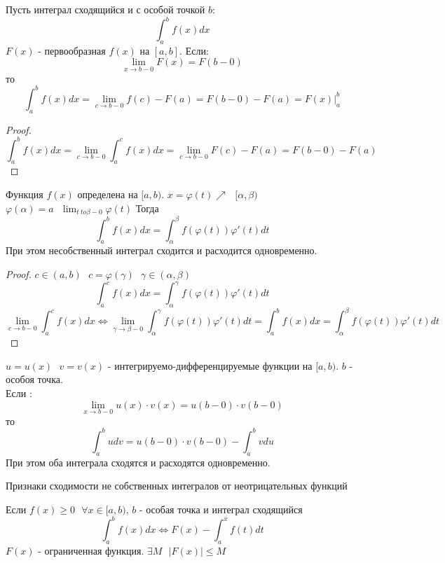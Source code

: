 \begin{theorem}[3]
  Пусть интеграл сходящийся и с особой точкой $b$:
  \[
    \int^{b}_{a} f(x)dx
  \]
  $F(x)$ - первообразная $f(x)$ на $[a, b]$. Если:
  \[
    \lim_{x \to  b - 0} F(x) = F(b - 0)
  \]
  то
  \[
    \int^{b}_{a} f(x)dx = \lim_{c \to b - 0} f(c) - F(a) = F(b - 0) - F(a) =
    F(x)|^{b}_{a}
  \]
\end{theorem}

\begin{proof}
  \[
    \int^{b}_{a} f(x)dx = \lim_{c \to b - 0} \int^{c}_{a} f(x)dx =
    \lim_{c \to b - 0} F(c) - F(a) = F(b - 0) - F(a)
  \]
\end{proof}

\begin{theorem}[4]
  Функция $f(x)$ определена на $[a, b)$. $x = \varphi(t) \nearrow ~~~
  [\alpha, \beta)$\\
  $\varphi(\alpha) = a ~~~ \lim_{t \ to \beta - 0} \varphi(t)$ Тогда
  \[
    \int^{b}_{a} f(x)dx = \int^{\beta}_{\alpha} f(\varphi(t)) \varphi'(t)dt
  \]
  При этом несобственный интеграл сходится и расходится одновременно.
\end{theorem}

\begin{proof}
  $c \in (a, b) ~~~ c = \varphi(\gamma) ~~~ \gamma \in (\alpha, \beta)$
  \[
    \int^{c}_{a} f(x)dx = \int^{\gamma}_{\alpha} f(\varphi(t)) \varphi'(t)dt
  \]
  \[
    \lim_{c \to b - 0} \int^{c}_{a} f(x)dx \Leftrightarrow
    \lim_{\gamma \to \beta - 0} \int^{\gamma}_{\alpha} f(\varphi(t))
    \varphi'(t)dt = \int^{b}_{a} f(x)dx = \int^{\beta}_{\alpha} f(\varphi(t))
    \varphi'(t)dt
  \]
\end{proof}

\begin{theorem}[5]
  $u = u(x) ~~~ v = v(x)$ - интегрируемо-дифференцируемые функции на $[a, b)$.
  $b$ - особоя точка.\\
  Если :
  \[
    \lim_{x \to b - 0} u(x) \cdot v(x) = u(b - 0) \cdot v(b - 0)
  \]
  то
  \[
    \int^{b}_{a} udv = u(b - 0) \cdot v(b - 0) - \int^{b}_{a} vdu
  \]
  При этом оба интеграла сходятся и расходятся одновременно.
\end{theorem}

\begin{title}[\Large]
  Признаки сходимости не собственных интегралов от неотрицательных функций
\end{title}

\begin{theorem}[1]
  Если $f(x) \ge 0 ~~~ \forall x \in [a, b)$, $b$ - особая точка и интеграл
  сходящийся
  \[
    \int^{b}_{a} f(x)dx \Leftrightarrow F(x) - \int^{x}_{a} f(t)dt
  \]
  $F(x)$ - ограниченная функция. $\exists M ~~~ |F(x)| \le M$
\end{theorem}

